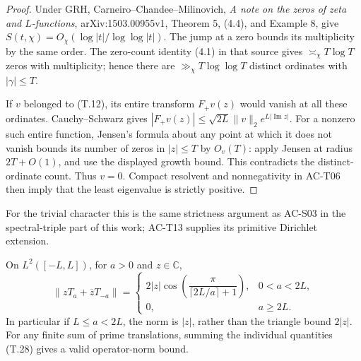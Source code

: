 \begin{proof}
Under GRH, Carneiro--Chandee--Milinovich,
\emph{A note on the zeros of zeta and
\(L\)-functions}, arXiv:1503.00955v1,
Theorem 5, (4.4), and Example 8, give
\(S(t,\chi)=O_\chi(\log|t|/\log\log|t|)\).
The jump at a zero bounds its multiplicity
by the same order. The
zero-count identity (4.1) in that source gives
\(\asymp_\chi T\log T\) zeros with multiplicity; hence there
are \(\gg_\chi T\log\log T\) distinct
ordinates with \(|\gamma|\leq T\).

If \(v\) belonged to (T.12), its entire
transform \(F_+v(z)\) would vanish at all
these ordinates. Cauchy--Schwarz gives
\(|F_+v(z)|\leq\sqrt{2L}\|v\|_2e^{L|\operatorname{Im}z|}\).
For a nonzero such entire function,
Jensen's formula about any point at
which it does not vanish bounds its
number of zeros in \(|z|\leq T\) by
\(O_v(T)\): apply Jensen at radius
\(2T+O(1)\), and use the displayed
growth bound. This contradicts the
distinct-ordinate count. Thus \(v=0\).
Compact resolvent and nonnegativity
in AC-T06 then imply that the least
eigenvalue is strictly positive.
\end{proof}

For the trivial character this is the
same strictness argument as AC-S03
in the spectral-triple part of this
work; AC-T13 supplies its primitive
Dirichlet extension.

\begin{proposition}
\label{AC-T14}
On \(L^2([-L,L])\), for \(a>0\) and \(z\in\mathbb C\),
\[
 \|zT_a+\overline zT_{-a}\|=
 \begin{cases}
  2|z|\cos\!\left(\dfrac{\pi}
             {\lceil 2L/a\rceil+1}\right),&0<a<2L,\\
  0,&a\geq2L.
 \end{cases}                                                 \tag{T.28}
\]
In particular if \(L\leq a<2L\), the norm
is \(|z|\), rather than the triangle
bound \(2|z|\). For any finite sum
of prime translations, summing the
individual quantities (T.28) gives
a valid operator-norm bound.
\end{proposition}

